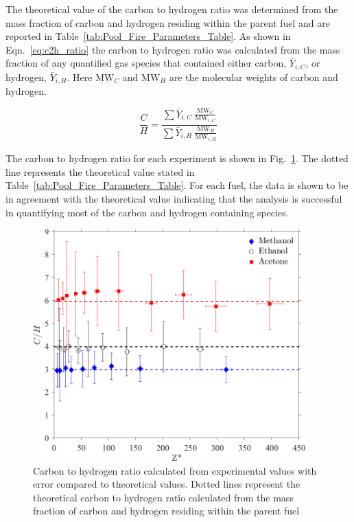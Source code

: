 \documentclass[12pt]{article}
\begin{document}
The theoretical value of the carbon to hydrogen ratio was determined from the mass fraction of carbon and hydrogen residing within the parent fuel and are reported in Table~\ref{tab:Pool_Fire_Parameters_Table}. As shown in Eqn.~\ref{eq:c2h_ratio} the carbon to hydrogen ratio was calculated from the mass fraction of any quantified gas species that contained either carbon, $\bar{Y}_{i,C}$, or hydrogen, $\bar{Y}_{i,H}$. Here $\textrm{MW}_{C}$ and $\textrm{MW}_{H}$ are the molecular weights of carbon and hydrogen.

\begin{equation}\label{eq:c2h_ratio}
 \frac{C}{H}=\frac{\sum{\bar{Y}_{i,C}~{\frac{\textrm{MW}_{C}}{\textrm{MW}_{i,C}}}}}{\sum{\bar{Y}_{i,H}~{\frac{\textrm{MW}_{H}}{\textrm{MW}_{i,H}}}}}
\end{equation}

The carbon to hydrogen ratio for each experiment is shown in Fig.~\ref{fig:C2H}. The dotted line represents the theoretical value stated in Table~\ref{tab:Pool_Fire_Parameters_Table}. For each fuel, the data is shown to be in agreement with the theoretical value indicating that the analysis is successful in quantifying most of the carbon and hydrogen containing species.   

\begin{figure}[h!]
	\centering
\includegraphics[width=10.5cm, keepaspectratio]{C2H_ratio_Comparison.png}
	\caption[Carbon to hydrogen ratio calculated from experimental values compared to theoretical values]{Carbon to hydrogen ratio calculated from experimental values with error compared to theoretical values. Dotted lines represent the theoretical carbon to hydrogen ratio calculated from the mass fraction of carbon and hydrogen residing within the parent fuel}
	\label{fig:C2H}
\end{figure}
\end{document}
